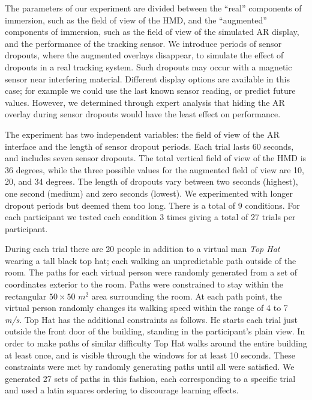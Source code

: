 \documentclass{acmsiggraph}                     %
\begin{document}
The parameters of our experiment are divided between the ``real'' components of immersion, such as the field of view of the HMD, and the ``augmented'' components of immersion, such as the field of view of the simulated AR display, and the performance of the tracking sensor.  We introduce periods of sensor dropouts, where the augmented overlays disappear, to simulate the effect of dropouts in a real tracking system.  Such dropouts may occur with a magnetic sensor near interfering material.  Different display options are available in this case; for example we could use the last known sensor reading, or predict future values.
However, we determined through expert analysis that hiding the AR overlay during sensor dropouts would have the least effect on performance.

The experiment has two independent variables: the field of view of the AR interface and the length of sensor dropout periods.  Each trial lasts 60 seconds, and includes seven sensor dropouts.  The total vertical field of view of the HMD is 36 degrees, while the three possible values for the augmented field of view are 10, 20, and 34 degrees.  The length of dropouts vary between two seconds (highest), one second (medium) and zero seconds (lowest).  We experimented with longer dropout periods but deemed them too long.  There is a total of 9 conditions.  For each participant we tested each condition 3 times giving a total of 27 trials per participant.

During each trial there are 20 people in addition to a virtual man \emph{Top Hat} wearing a tall black top hat; each walking an unpredictable path outside of the room.  The paths for each virtual person were randomly generated from a set of coordinates exterior to the room.  Paths were constrained to stay within the rectangular $50\times50$ $m^2$ area surrounding the room.  At each path point, the virtual person randomly changes its walking speed within the range of 4 to 7 \emph{m/s}.  Top Hat has the additional constraints as follows.  He starts each trial just outside the front door of the building, standing in the participant's plain view.  In order to make paths of similar difficulty Top Hat walks around the entire building at least once, and is visible through the windows for at least 10 seconds.  These constraints were met by randomly generating paths until all were satisfied.  We generated 27 sets of paths in this fashion, each corresponding to a specific trial and used a latin squares ordering to discourage learning effects.
\end{document}
